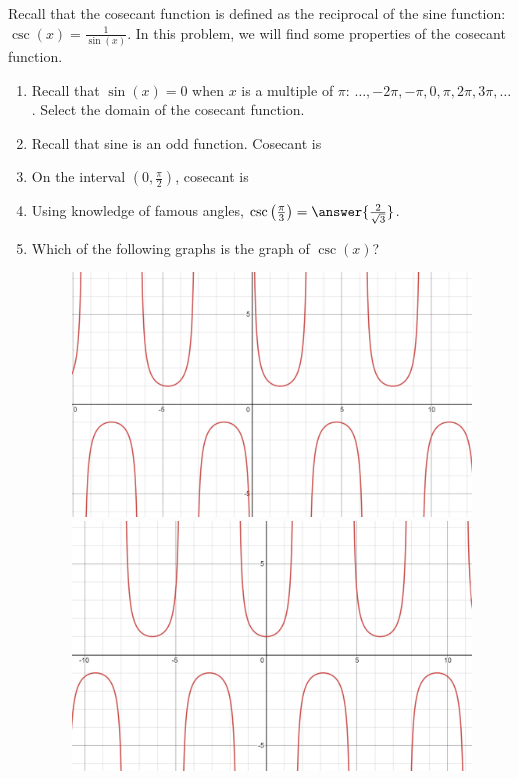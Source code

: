 \documentclass{ximera}
\author{Kenneth Berglund}
\begin{document}
Recall that the cosecant function is defined as the reciprocal of the sine function: $\csc(x) = \frac{1}{\sin(x)}$. In this problem, we will find some properties of the cosecant function. 
\begin{exercise}
\begin{enumerate}
\item Recall that $\sin(x) = 0$ when $x$ is a multiple of $\pi$: $\ldots, -2\pi, -\pi, 0, \pi, 2\pi, 3\pi, \ldots$. Select the domain of the cosecant function.
\begin{multipleChoice}
\choice{$(- \infty, \infty)$}
\end{multipleChoice}


\item Recall that sine is an odd function. Cosecant is 
\begin{multipleChoice}
\end{multipleChoice}


\item On the interval $\left(0, \frac{\pi}{2}\right)$, cosecant is 
\begin{multipleChoice}
\end{multipleChoice}

\item Using knowledge of famous angles, $\csc\left(\frac{\pi}{3}\right) = \answer{\frac{2}{\sqrt{3}}}$.

\item Which of the following graphs is the graph of $\csc(x)$?
\begin{figure}[!h]
\begin{image}
\includegraphics[width=.4\linewidth]{ex8-a.png}
\hspace{20mm}
\includegraphics[width=.4\linewidth]{ex8-b.png}


\end{image}
\end{figure}
\end{enumerate}
\end{exercise}
\end{document}
